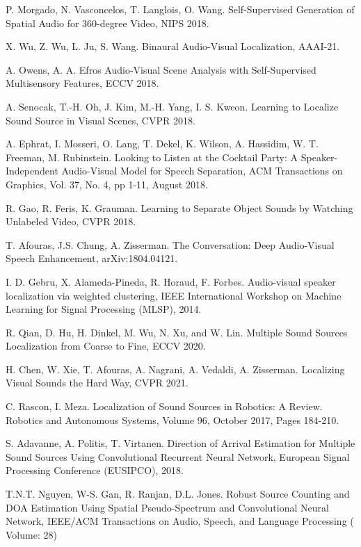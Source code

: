 \documentclass[10pt,twocolumn,letterpaper]{article}
\begin{document}
\small
\begin{thebibliography}{9}
 P. Morgado, N. Vasconcelos, T. Langlois, O. Wang.
Self-Supervised Generation of Spatial Audio for 360-degree Video,
NIPS 2018.

 X. Wu, Z. Wu, L. Ju, S. Wang. 
Binaural Audio-Visual Localization,
AAAI-21.

 A. Owens,     A. A. Efros   
Audio-Visual Scene Analysis with Self-Supervised Multisensory Features,
ECCV 2018.

 A. Senocak, T.-H. Oh, J. Kim, M.-H. Yang, I. S. Kweon. Learning to Localize Sound Source in Visual Scenes, CVPR 2018.

 A. Ephrat, I. Mosseri, O. Lang, T. Dekel, K. Wilson, A. Hassidim, W. T. Freeman, M. Rubinstein. 
	Looking to Listen at the Cocktail Party: A Speaker-Independent Audio-Visual Model for Speech Separation,
ACM Transactions on Graphics, Vol. 37, No. 4, pp 1-11, August 2018.

 R. Gao, R. Feris, K. Grauman. Learning to Separate Object Sounds by Watching Unlabeled Video, CVPR 2018.

 T. Afouras, J.S. Chung, A. Zisserman. The Conversation: Deep Audio-Visual Speech Enhancement,  arXiv:1804.04121. 

I. D. Gebru, X. Alameda-Pineda, R. Horaud, F. Forbes.
Audio-visual speaker localization via weighted clustering,
IEEE International Workshop on Machine Learning for Signal Processing (MLSP), 2014.

R. Qian, D. Hu, H. Dinkel, M. Wu, N. Xu, and W. Lin.
Multiple Sound Sources Localization from Coarse to Fine,
ECCV 2020.

H. Chen, W. Xie, T. Afouras, A. Nagrani, A. Vedaldi, A. Zisserman. 
Localizing Visual Sounds the Hard Way,
CVPR 2021.

C. Rascon, I. Meza. Localization of Sound Sources in Robotics: A Review.
Robotics and Autonomous Systems, Volume 96, October 2017, Pages 184-210.

S. Adavanne, A. Politis, T. Virtanen.
Direction of Arrival Estimation for Multiple Sound Sources Using Convolutional Recurrent Neural Network, European Signal Processing Conference (EUSIPCO), 2018.

T.N.T. Nguyen, W-S. Gan, R. Ranjan, D.L. Jones.
Robust Source Counting and DOA Estimation Using Spatial Pseudo-Spectrum and Convolutional Neural Network, IEEE/ACM Transactions on Audio, Speech, and Language Processing ( Volume: 28)


\end{thebibliography}
\end{document}
